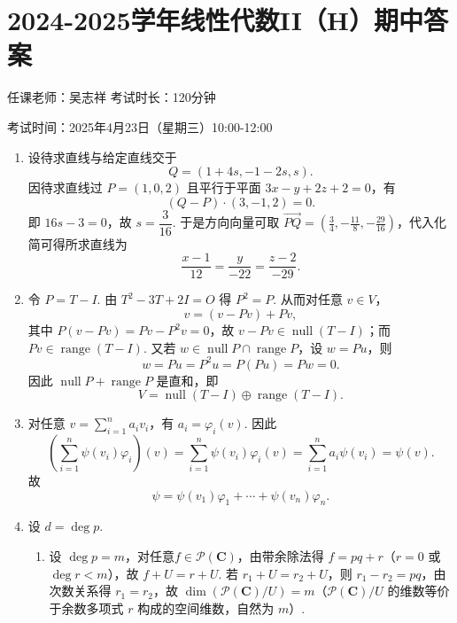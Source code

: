 \section{2024-2025学年线性代数II（H）期中答案}

\begin{center}
    任课老师：吴志祥\hspace{4em} 考试时长：120分钟

    考试时间：2025年4月23日（星期三）10:00-12:00
\end{center}
\begin{enumerate}
    \item 设待求直线与给定直线交于
    \[
        Q=(1+4s,-1-2s,s).
    \]
    因待求直线过 $P=(1,0,2)$ 且平行于平面 $3x-y+2z+2=0$，有
    \[
        (Q-P)\cdot(3,-1,2)=0.
    \]
    即 $16s-3=0$，故 $s=\dfrac{3}{16}$. 于是方向向量可取 $\overrightarrow{PQ}=\left(\frac34,-\frac{11}{8},-\frac{29}{16}\right)$，代入化简可得所求直线为
    \[
        \frac{x-1}{12}=\frac{y}{-22}=\frac{z-2}{-29}.
    \]

    \item 令 $P=T-I$. 由 $T^2-3T+2I=O$ 得 $P^2=P$. 从而对任意 $v\in V$，
    \[
        v=(v-Pv)+Pv,
    \]
    其中 $P(v-Pv)=Pv-P^2v=0$，故 $v-Pv\in\operatorname{null}(T-I)$；而 $Pv\in\operatorname{range}(T-I)$. 又若 $w\in\operatorname{null}P\cap\operatorname{range}P$，设 $w=Pu$，则
    \[
        w=Pu=P^2u=P(Pu)=Pw=0.
    \]
    因此 $\operatorname{null} P + \operatorname{range} P$ 是直和，即
    \[
        V=\operatorname{null}(T-I)\oplus\operatorname{range}(T-I).
    \]

    \item 对任意 $v=\displaystyle\sum_{i=1}^n a_i v_i$，有 $a_i=\varphi_i(v)$. 因此
    \[
        \left(\sum_{i=1}^n \psi(v_i)\varphi_i\right)(v)
        =
        \sum_{i=1}^n\psi(v_i)\varphi_i(v)
        =
        \sum_{i=1}^n a_i\psi(v_i)
        =
        \psi(v).
    \]
    故
    \[
        \psi=\psi(v_1)\varphi_1+\cdots+\psi(v_n)\varphi_n.
    \]

    \item 设 $d=\deg p$.
    \begin{enumerate}
        \item 设 $\deg p = m$，对任意$f\in\mathcal{P}(\mathbf{C})$，由带余除法得 $f = pq + r$（$r=0$ 或 $\deg r < m$），故 $f + U = r + U$. 若 $r_1 + U = r_2 + U$，则 $r_1 - r_2 = pq$，由次数关系得 $r_1 = r_2$，故 $\dim(\mathcal{P}(\mathbf{C})/U) = m$（$\mathcal{P}(\mathbf{C})/U$ 的维数等价于余数多项式 $r$ 构成的空间维数，自然为 $m$）.


\end{enumerate}
\end{enumerate}
